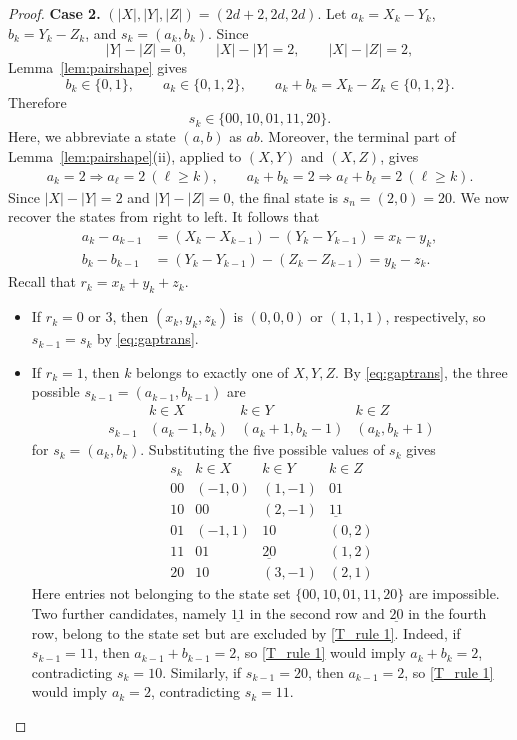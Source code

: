 \documentclass[11pt]{amsart}
\theoremstyle{definition}
\numberwithin{equation}{section}
\begin{document}
\begin{proof}
\smallskip

\noindent
{\bf Case 2.}
$(|X|,|Y|,|Z|)=(2d+2,2d,2d)$.
Let $a_k=X_k-Y_k$, $b_k=Y_k-Z_k$, and $s_k=(a_k,b_k)$.
Since
$$
|Y|-|Z|=0,\qquad |X|-|Y|=2,\qquad |X|-|Z|=2,
$$
Lemma~\ref{lem:pairshape} gives
$$
b_k\in\{0,1\},\qquad
a_k\in\{0,1,2\},\qquad
a_k+b_k=X_k-Z_k\in\{0,1,2\}.
$$
Therefore
\[
 s_k\in\{00,10,01,11,20\}.
\]
Here, we abbreviate a state $(a,b)$ as $ab$.
Moreover, the terminal part of Lemma~\ref{lem:pairshape}(ii), applied to $(X,Y)$ and $(X,Z)$, gives
\begin{align} \label{T_rule 1}
     a_k=2\Longrightarrow a_\ell=2\ (\ell\ge k),
 \qquad
 a_k+b_k=2\Longrightarrow a_\ell+b_\ell=2\ (\ell\ge k).
\end{align}
Since $|X|-|Y|=2$ and $|Y|-|Z|=0$, the final state is $s_n=(2,0)=20$. 
We now recover the states from right to left.
It follows that
\begin{equation}\label{eq:gaptrans}
\begin{aligned}
 a_k-a_{k-1}&= (X_k - X_{k-1}) - (Y_k - Y_{k-1}) = x_k-y_k,\\
 b_k-b_{k-1}&= (Y_k - Y_{k-1}) - (Z_k - Z_{k-1})=y_k-z_k.
\end{aligned}
\end{equation}
Recall that $r_k=x_k+y_k+z_k$.
\begin{itemize}
\item
If $r_k=0$ or $3$, then $(x_k,y_k,z_k)$ is $(0,0,0)$ or $(1,1,1)$, respectively, so $s_{k-1}=s_k$ by \eqref{eq:gaptrans}. 

\item 

If \(r_k=1\), then \(k\) belongs to exactly one of \(X,Y,Z\).  
By \eqref{eq:gaptrans}, the three possible $s_{k-1} = (a_{k-1},b_{k-1})$ are
\begin{equation} \label{eq:pred1}
\begin{array}{c|ccc}
 & k\in X & k\in Y & k\in Z\\
\hline
s_{k-1}
&
(a_k-1,b_k)
&
(a_k+1,b_k-1)
&
(a_k,b_k+1)
\end{array}
\end{equation}
for \(s_k=(a_k,b_k)\).  Substituting the five possible values of
\(s_k\) gives
$$
\begin{array}{c|ccc}
s_k
& k\in X
& k\in Y
& k\in Z\\
\hline
00 & (-1,0) & (1,-1) & 01\\
10 & 00 & (2,-1) & \underline{11}\\
01 & (-1,1) & 10 & (0,2)\\
11 & 01 & \underline{20} & (1,2)\\
20 & 10 & (3,-1) & (2,1)
\end{array}
$$
Here entries not belonging to the state set
$
\{00,10,01,11,20\}
$
are impossible.  Two further candidates, namely \(\underline{11}\) in the second
row and \(\underline{20}\) in the fourth row, belong to the state set but are
excluded by \eqref{T_rule 1}.  
Indeed, if \(s_{k-1}=11\), then
\(a_{k-1}+b_{k-1}=2\), so \eqref{T_rule 1} would imply
\(a_k+b_k=2\), contradicting \(s_k=10\).  
Similarly, if
\(s_{k-1}=20\), then \(a_{k-1}=2\), so \eqref{T_rule 1} would
imply \(a_k=2\), contradicting \(s_k=11\).


\end{itemize}
\end{proof}
\end{document}
